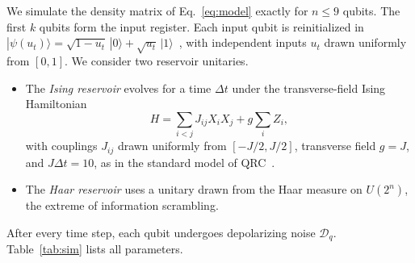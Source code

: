 \documentclass[aps,pra,reprint,superscriptaddress,floatfix]{revtex4-2}
\theoremstyle{plain}
\newcommand{\ket}[1]{|#1\rangle}
\newcommand{\cD}{\mathcal D}
\begin{document}
We simulate the density matrix of Eq.~\eqref{eq:model} exactly for $n\le9$ qubits. The first $k$ qubits form the input register. Each input qubit is reinitialized in $\ket{\psi(u_t)}=\sqrt{1-u_t}\,\ket0+\sqrt{u_t}\,\ket1$~\cite{Fujii2017}, with independent inputs $u_t$ drawn uniformly from $[0,1]$. We consider two reservoir unitaries.
\begin{itemize}
\item The \emph{Ising reservoir} evolves for a time $\Delta t$ under the transverse-field Ising Hamiltonian
\begin{equation}
H=\sum_{i<j}J_{ij}X_iX_j+g\sum_iZ_i,
\end{equation}
with couplings $J_{ij}$ drawn uniformly from $[-J/2,J/2]$, transverse field $g=J$, and $J\Delta t=10$, as in the standard model of QRC~\cite{Fujii2017,Nakajima2019,MartinezPena2021}.
\item The \emph{Haar reservoir} uses a unitary drawn from the Haar measure on $U(2^n)$, the extreme of information scrambling.
\end{itemize}
After every time step, each qubit undergoes depolarizing noise $\cD_q$. Table~\ref{tab:sim} lists all parameters.
\end{document}
